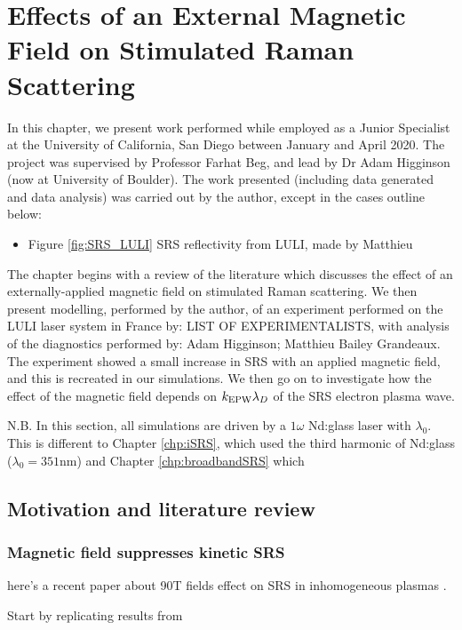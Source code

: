 \chapter{Effects of an External Magnetic Field on Stimulated Raman Scattering}
\label{chp:magSRS}

In this chapter, we present work performed while employed as a Junior Specialist at the University of California, San Diego between January and April 2020. The project was supervised by Professor Farhat Beg, and lead by Dr Adam Higginson (now at University of Boulder). The work presented (including data generated and data analysis) was carried out by the author, except in the cases outline below:
\begin{itemize}
\item Figure \ref{fig:SRS_LULI} SRS reflectivity from LULI, made by Matthieu
\end{itemize}

The chapter begins with a review of the literature which discusses the effect of an externally-applied magnetic field on stimulated Raman scattering. We then present modelling, performed by the author, of an experiment performed on the LULI laser system in France by: LIST OF EXPERIMENTALISTS, with analysis of the diagnostics performed by: Adam Higginson; Matthieu Bailey Grandeaux. The experiment showed a small increase in SRS with an applied magnetic field, and this is recreated in our simulations. We then go on to investigate how the effect of the magnetic field depends on $k_\mathrm{EPW}\lambda_D$ of the SRS electron plasma wave.

N.B. In this section, all simulations are driven by a $1\omega$ Nd:glass laser with $\lambda_0$. This is different to Chapter \ref{chp:iSRS}, which used the third harmonic of Nd:glass ($\lambda_0=351\si{\nano\metre}$) and Chapter \ref{chp:broadbandSRS} which 

\section{Motivation and literature review}

\subsection{Magnetic field suppresses kinetic SRS}

here's a recent paper about 90T fields effect on SRS in inhomogeneous plasmas \citep{Zhou2021}. 

Start by replicating results from \cite{Winjum2018}

